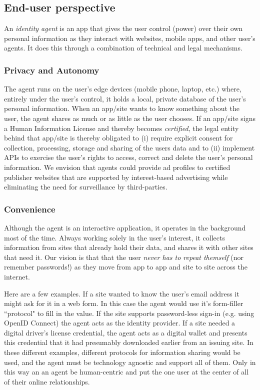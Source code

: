 \documentclass[11pt, oneside]{article}   	%
\begin{document}
\subsection{End-user perspective}
An \emph{identity agent} is an app that gives the user control (power) over their own personal information as they interact with websites, mobile apps, and other user's agents. It does this through a combination of technical and legal mechanisms.

\subsubsection{Privacy and Autonomy} 
The agent runs on the user's edge devices (mobile phone, laptop, etc.) where, entirely under the user's control, it holds a local, private database of the user's personal information. When an app/site wants to know something about the user, the agent shares as much or as little as the user chooses. If an app/site signs a Human Information License and thereby becomes \emph{certified}, the legal entity behind that app/site is thereby obligated to (i) require explicit consent for collection, processing, storage and sharing of the users data and to (ii) implement APIs to exercise the user's rights to access, correct and delete the user's personal information. We envision that agents could provide ad profiles to certified publisher websites that are supported by interest-based advertising while eliminating the need for surveillance by third-parties.

\subsubsection{Convenience}
Although the agent is an interactive application, it operates in the background most of the time. Always working solely in the user's interest, it collects information from sites that already hold their data, and shares it with other sites that need it. Our vision is that that the user \emph{never has to repeat themself} (nor remember passwords!) as they move from app to app and site to site across the internet.

Here are a few examples. If a site wanted to know the user's email address it might ask for it in a web form. In this case the agent would use it's form-filler ``protocol" to fill in the value. If the site supports password-less sign-in (e.g. using OpenID Connect) the agent acts as the identity provider. If a site needed a digital driver's license credential, the agent acts as a digital wallet and presents this credential that it had presumably downloaded earlier from an issuing site. In these different examples, different protocols for information sharing would be used, and the agent must be technology agnostic and support all of them. Only in this way an an agent be human-centric and put the one user at the center of all of their online relationships.
\end{document}

